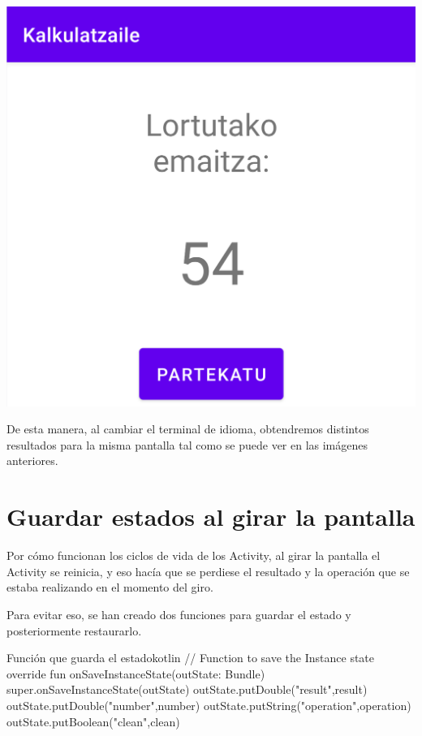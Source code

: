 \documentclass{\ClassPath/viu-tfm-template}
\begin{document}
{\begin{minipage}{0.32\linewidth}
\end{minipage}
\hfill
\begin{minipage}{0.32\linewidth}
    \includegraphics[frame,width=\linewidth]{img/euskara.png}
\end{minipage}

}

De esta manera, al cambiar el terminal de idioma, obtendremos distintos resultados para la misma pantalla tal como se puede ver en las imágenes anteriores.


\section{Guardar estados al girar la pantalla}

Por cómo funcionan los ciclos de vida de los Activity, al girar la pantalla el Activity se reinicia, y eso hacía que se perdiese el resultado y la operación que se estaba realizando en el momento del giro.

Para evitar eso, se han creado dos funciones para guardar el estado y posteriormente restaurarlo.

\begin{mycode}{Función que guarda el estado}{kotlin}{}
// Function to save the Instance state
override fun onSaveInstanceState(outState: Bundle) {
    super.onSaveInstanceState(outState)
    outState.putDouble("result",result)
    outState.putDouble("number",number)
    outState.putString("operation",operation)
    outState.putBoolean("clean",clean)
}
\end{mycode}
\end{document}
